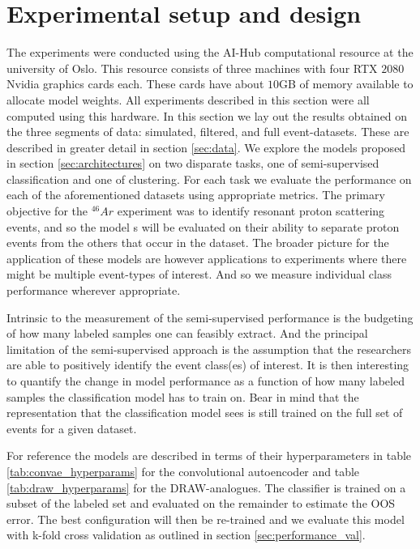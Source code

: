 \chapter{Experimental setup and design}

The experiments were conducted using the AI-Hub computational resource at the university of Oslo.  This resource consists of three machines with four RTX $2080$ Nvidia graphics cards each. These cards have about $10$GB of memory available to allocate model weights. All experiments described in this section were all computed using this hardware. In this section we lay out the results obtained on the three segments of data: simulated, filtered, and full event-datasets. These are described in greater detail in section \ref{sec:data}. We explore the models proposed in section \ref{sec:architectures} on two disparate tasks, one of semi-supervised classification and one of clustering. For each task  we evaluate the performance on each of the aforementioned datasets using appropriate metrics. The primary objective for the  ${}^{46}Ar$ experiment was to identify resonant proton scattering events, and so the model s will be evaluated on their ability to separate proton events from the others that occur in the dataset. The broader picture for the application of these models are however applications to experiments where there might be multiple event-types of interest. And so we measure individual class performance wherever appropriate. 

Intrinsic to the measurement of the semi-supervised performance is the budgeting of how many labeled samples one can feasibly extract. And the principal limitation of the semi-supervised approach is the assumption that the researchers are able to positively identify the event class(es) of interest. It is then interesting to quantify the change in model performance as a function of how many labeled samples the classification model has to train on. Bear in mind that the representation that the classification model sees is still trained on the full set of events for a given dataset. 

For reference the models are described in terms of their hyperparameters in table \ref{tab:convae_hyperparams} for the convolutional autoencoder and table \ref{tab:draw_hyperparams} for the DRAW-analogues. The classifier is trained on a subset of the labeled set and evaluated on the remainder to estimate the OOS error. The best configuration will then be re-trained and we evaluate this model with k-fold cross validation as outlined in section \ref{sec:performance_val}.



